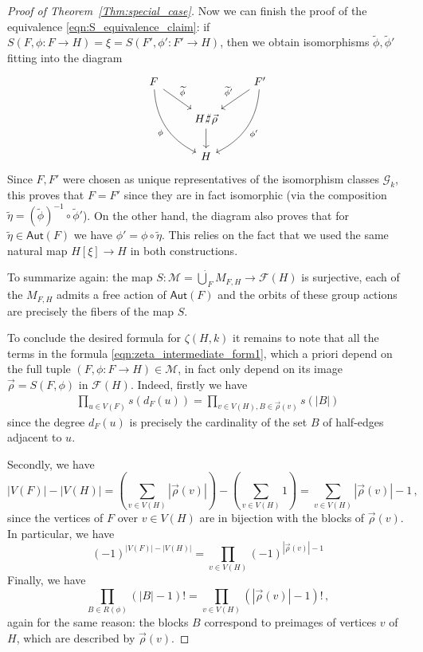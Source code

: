 \documentclass[authorcolumns,numberwithinsect]{no-lipics-v2022}
\def\fracture#1#2{\ensuremath{#1\raisebox{.2ex}{\rotatebox[origin=c]{-15}{$\sharp$}}#2}}
\def\fracture#1#2{\ensuremath{#1\raisebox{.2ex}{\rotatebox[origin=c]{-15}{$\sharp$}}#2}}
\begin{document}
\begin{proof}[Proof of Theorem~\ref{Thm:special_case}]
Now we can finish the proof of the equivalence \eqref{eqn:S_equivalence_claim}: if $S(F, \phi: F \to H) = \xi = S(F', \phi': F' \to H)$, then we obtain isomorphisms $\widetilde \phi, \widetilde \phi'$ fitting into the diagram
\[
\begin{tikzcd}
F \arrow[dr, "\widetilde \phi"]  \arrow[ddr, bend right, "\phi", swap] & & F' \arrow[ld, "\widetilde \phi'", swap] \arrow[ddl, bend left, "\phi'"]\\
& \fracture{H}{\vec\rho} \arrow[d] &\\
& H &
\end{tikzcd}
\]
Since $F,F'$ were chosen as unique representatives of the isomorphism classes $\mathcal{G}_k$, this proves that $F=F'$ since they are in fact isomorphic (via the composition $\widetilde \eta = (\widetilde \phi)^{-1} \circ \widetilde \phi'$). On the other hand, the diagram also proves that for $\widetilde \eta\in \mathsf{Aut}(F)$ we have $\phi' = \phi \circ \widetilde \eta$. This relies on the fact that we used the same natural map $H[\xi] \to H$ in both constructions.

To summarize again: the map $S : \mathcal{M} = \dot\bigcup_{F} M_{F,H} \to \mathcal{F}(H)$ is surjective, each of the $M_{F,H}$ admits a free action of $\mathsf{Aut}(F)$ and the orbits of these group actions are precisely the fibers of the map $S$.

To conclude the desired formula for $\zeta(H,k)$ it remains to note that all the terms in the formula \eqref{eqn:zeta_intermediate_form1}, which a priori depend on the full tuple $(F, \phi: F \to H) \in \mathcal{M}$, in fact only depend on its image $\vec\rho = S(F, \phi)$ in $\mathcal{F}(H)$. Indeed, firstly we have
\begin{align*}
\prod_{u \in V(F)} s(d_F(u)) = \prod_{v \in V(H), B \in \vec\rho(v)} s(|B|)
\end{align*}
since the degree $d_F(u)$ is precisely the cardinality of the set $B$ of half-edges adjacent to $u$.

Secondly, we have
\[
|V(F)| - |V(H)| =\left( \sum_{v \in V(H)} |\vec\rho(v)| \right) - \left(\sum_{v \in V(H)} 1 \right)  = \sum_{v \in V(H)} |\vec\rho(v)| -1\,,
\]
since the vertices of $F$ over $v \in V(H)$ are in bijection with the blocks of $\vec\rho(v)$. In particular, we have
\[
(-1)^{|V(F)| - |V(H)|} = \prod_{v \in V(H)} (-1)^{|\vec\rho(v)| -1}
\]
Finally, we have
\[
\prod_{B \in R(\phi)} (|B|-1)! = \prod_{v \in V(H)} (|\vec\rho(v)|-1)!\,,
\]
again for the same reason: the blocks $B$ correspond to preimages of vertices $v$ of $H$, which are described by $\vec\rho(v)$.


\end{proof}
\end{document}
